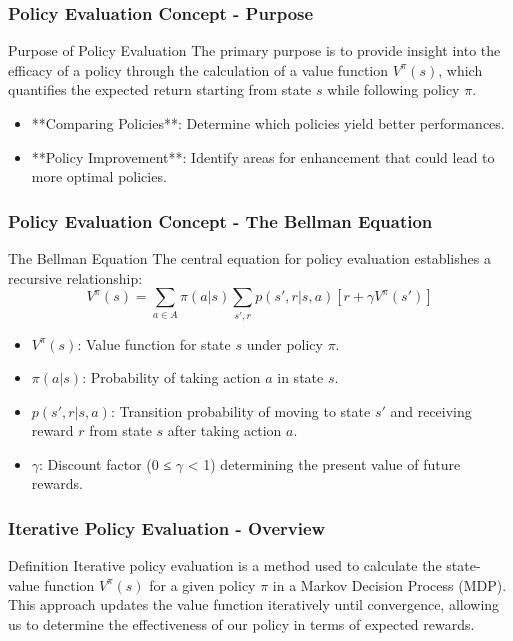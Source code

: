 \documentclass[aspectratio=169]{beamer}
\begin{document}
\begin{frame}[fragile]
  \frametitle{Policy Evaluation Concept - Purpose}
  \begin{block}{Purpose of Policy Evaluation}
    The primary purpose is to provide insight into the efficacy of a policy through the calculation of a value function \(V^\pi(s)\), which quantifies the expected return starting from state \(s\) while following policy \(\pi\).
  \end{block}
  \begin{itemize}
    \item **Comparing Policies**: Determine which policies yield better performances.
    \item **Policy Improvement**: Identify areas for enhancement that could lead to more optimal policies.
  \end{itemize}
\end{frame}

\begin{frame}[fragile]
  \frametitle{Policy Evaluation Concept - The Bellman Equation}
  \begin{block}{The Bellman Equation}
    The central equation for policy evaluation establishes a recursive relationship:
    \begin{equation}
      V^\pi(s) = \sum_{a \in A} \pi(a|s) \sum_{s', r} p(s', r | s, a) \left[ r + \gamma V^\pi(s') \right]
    \end{equation}
    \begin{itemize}
      \item \(V^\pi(s)\): Value function for state \(s\) under policy \(\pi\).
      \item \(\pi(a|s)\): Probability of taking action \(a\) in state \(s\).
      \item \(p(s', r | s, a)\): Transition probability of moving to state \(s'\) and receiving reward \(r\) from state \(s\) after taking action \(a\).
      \item \(\gamma\): Discount factor (0 ≤ \(\gamma\) < 1) determining the present value of future rewards.
    \end{itemize}
  \end{block}
\end{frame}

\begin{frame}[fragile]
    \frametitle{Iterative Policy Evaluation - Overview}
    \begin{block}{Definition}
        Iterative policy evaluation is a method used to calculate the state-value function \( V^{\pi}(s) \) for a given policy \( \pi \) in a Markov Decision Process (MDP). 
        This approach updates the value function iteratively until convergence, allowing us to determine the effectiveness of our policy in terms of expected rewards.
    \end{block}
\end{frame}
\end{document}
